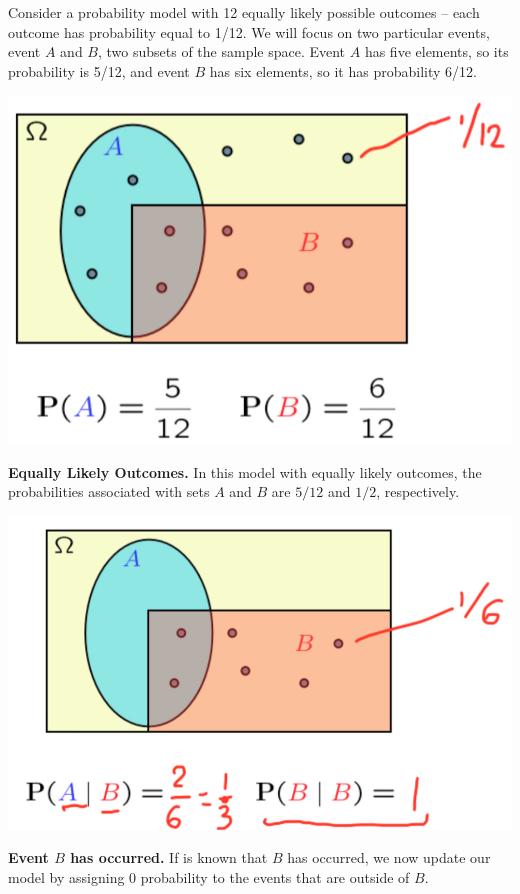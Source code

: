 \documentclass{tufte-handout}
\begin{document}
 Consider a probability model with
12 equally likely possible outcomes -- each outcome has probability equal to 1/12. We will
focus on two particular events, event $A$ and $B$, two subsets of the sample space. Event $A$ has five
elements, so its probability is 5/12, and event $B$ has six elements, so it has probability 6/12.
\begin{marginfigure}
  \includegraphics{Cond1}
  \caption{\textbf{Equally Likely Outcomes.} In this model with equally likely outcomes, the probabilities associated with sets $A$ and $B$ are $5/12$ and $1/2$, respectively.}
\end{marginfigure}
\begin{marginfigure}
  \includegraphics{CondBoccured}
  \caption{\textbf{Event $B$ has occurred.} If is known that $B$ has occurred, we now update our model by assigning 0 probability to the events that are outside of $B$.}
\end{marginfigure}
\end{document}
